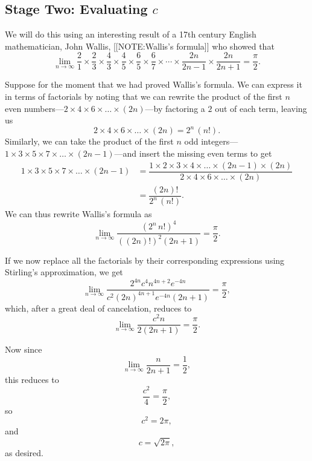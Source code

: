 \subsection{Stage Two: Evaluating $c$}
\label{subsec:stage-two-evaluating-c}

We will do this using an interesting result of a 17th century English
mathematician, John Wallis,
[[NOTE:Wallis's formula]]
who showed that
\[
\lim_{n \rightarrow \infty} \dfrac{2}{1} \times \dfrac{2}{3}
   \times \dfrac{4}{3}\times \dfrac{4}{5}\times \dfrac{6}{5}
   \times \dfrac{6}{7}\times \cdots \times \dfrac{2n}{2n-1}
   \times \dfrac{2n}{2n+1} = \dfrac{\pi}{2}.
\]

Suppose for the moment that we had proved Wallis's formula. We can
express it in terms of factorials by noting that we can rewrite the
product of the first $n$ even numbers---$2\times 4\times 6\times
\ldots \times (2n)$---by factoring a $2$ out of each term, leaving us
\[
2\times 4\times 6\times \ldots \times (2n) = 2^n\,(n!).
\]
Similarly, we can take the product of the first $n$ odd
integers---$1\times 3\times 5\times 7\times \ldots \times
(2n-1)$---and insert the missing even terms to get
\begin{align*}
1\times 3\times 5\times 7\times \ldots \times (2n-1) 
  &= \dfrac{1\times 2\times 3\times 4\times \ldots \times (2n-1)
            \times (2n)}
      {2\times 4\times 6\times \ldots \times (2n)} \\
  &= \dfrac{(2n)!}{2^n\,(n!)}.
\end{align*}
We can thus rewrite Wallis's formula as
\[
\lim_{n \rightarrow \infty} \dfrac{\left(2^n\,n!\right)^4}{\left((2n)!\right)^2(2n+1)}= \dfrac{\pi}{2}.
\]

If we now replace all the factorials by their corresponding expressions using Stirling's approximation, we get
\[
\lim_{n \rightarrow \infty} \dfrac{2^{4n}c^4n^{4n+2}e^{-4n}}{c^2(2n)^{4n+1}e^{-4n}(2n+1)}= \dfrac{\pi}{2},
\]
which, after a great deal of cancelation, reduces to
\[
\lim_{n \rightarrow \infty} \dfrac{c^2n}{2(2n+1)}= \dfrac{\pi}{2}.
\]

Now since
\[
\lim_{n \rightarrow \infty} \dfrac{n}{2n+1} = \dfrac{1}{2},
\]
this reduces to
\[
\dfrac{c^2}{4} = \dfrac{\pi}{2},
\]
so
\[
c^2 = 2\pi,
\]
and
\[
c=\sqrt{2\pi},
\]
as desired.

